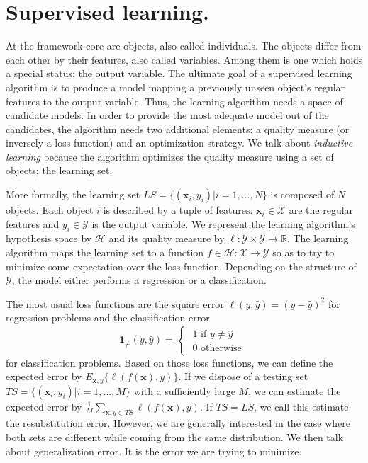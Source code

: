 \documentclass[a4paper]{report}
\newlength{\larg}
\begin{document}
\section{Supervised learning.}
At the framework core are objects, also called individuals. The objects differ from each other by their features, also called variables. Among them is one which holds a special status: the output variable. The ultimate goal of a supervised learning algorithm is to produce a model mapping a previously unseen object's regular features to the output variable. Thus, the learning algorithm needs a space of candidate models. In order to provide the most adequate model out of the candidates, the algorithm needs two additional elements: a quality measure (or inversely a loss function) and an optimization strategy. We talk about \textit{inductive learning} because the algorithm optimizes the quality measure using a set of objects; the learning set. 
\par
More formally, the learning set $LS = \{ (\boldsymbol{x}_i, y_i) | i = 1,..., N\}$ is composed of $N$ objects. Each object $i$ is described by a tuple of features: $\boldsymbol{x}_i \in \mathcal{X}$ are the regular features and $y_i \in \mathcal{Y}$ is the output variable. We represent the learning algorithm's hypothesis space by $\mathcal{H}$ and its quality measure by $\ell : \mathcal{Y} \times \mathcal{Y} \rightarrow \mathbb{R}$. The learning algorithm maps the learning set to a function $f \in \mathcal{H} : \mathcal{X} \rightarrow \mathcal{Y}$ so as to try to minimize some expectation over the loss function. Depending on the structure of $\mathcal{Y}$, the model either performs a regression or a classification.
\par
The most usual loss functions are the square error $\ell(y, \hat{y}) = (y - \hat{y})^2$ for regression problems and the classification error
\[
\boldsymbol{1}_{\neq}(y,\hat{{y}})=\begin{cases}
\begin{array}{c}
1\text{ if }y \neq \hat{y}\\
0\text{ otherwise}
\end{array}\end{cases}
\]
for classification problems. Based on those loss functions, we can define the expected error by $E_{\boldsymbol{x},y} \{\ell(f(\boldsymbol{x}), y)\}$. If we dispose of a testing set $TS = \{ (\boldsymbol{x}_i, y_i) | i = 1,..., M\}$ with a sufficiently large $M$, we can estimate the expected error by $\frac{1}{M}\sum_{\boldsymbol{x}, y \in TS} \ell(f(\boldsymbol{x}), y)$. If $TS = LS$, we call this estimate the resubstitution error. However, we are generally interested in the case where both sets are different while coming from the same distribution. We then talk about generalization error. It is the error we are trying to minimize.
\end{document}
